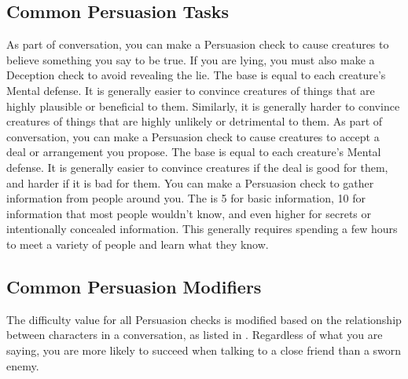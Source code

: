   \subsection{Common Persuasion Tasks}
     As part of conversation, you can make a Persuasion check to cause creatures to believe something you say to be true.
    If you are lying, you must also make a Deception check to avoid revealing the lie.
    The base  is equal to each creature's Mental defense.
    It is generally easier to convince creatures of things that are highly plausible or beneficial to them.
    Similarly, it is generally harder to convince creatures of things that are highly unlikely or detrimental to them.
     As part of conversation, you can make a Persuasion check to cause creatures to accept a deal or arrangement you propose.
    The base  is equal to each creature's Mental defense.
    It is generally easier to convince creatures if the deal is good for them, and harder if it is bad for them.
     You can make a Persuasion check to gather information from people around you.
    The  is 5 for basic information, 10 for information that most people wouldn't know, and even higher for secrets or intentionally concealed information.
    This generally requires spending a few hours to meet a variety of people and learn what they know.

  \subsection{Common Persuasion Modifiers}
    The difficulty value for all Persuasion checks is modified based on the relationship between characters in a conversation, as listed in .
    Regardless of what you are saying, you are more likely to succeed when talking to a close friend than a sworn enemy.

